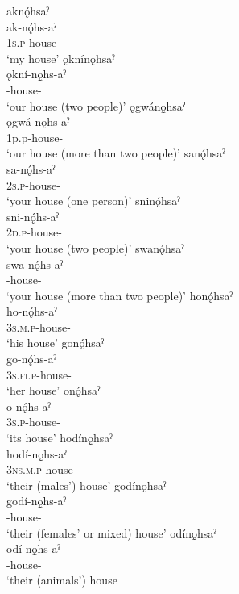 \ea\label{ex:possnounppex}
\ea aknǫ́hsaˀ\\
\gll ak-nǫ́hs-aˀ\\
 \textsc{1s.p}-house-{\nounstemformer}\\
\glt `my house'
\ex ǫknínǫ̱hsaˀ\\
\gll ǫkní-nǫ̱hs-aˀ\\
 -house-{\nounstemformer}\\
\glt `our house (two people)'
\ex ǫgwánǫ̱hsaˀ\\
\gll ǫgwá-nǫ̱hs-aˀ\\
 {1p.p}-house-{\nounstemformer}\\
\glt `our house (more than two people)'
\ex sanǫ́hsaˀ\\
\gll sa-nǫ́hs-aˀ\\
 \textsc{2s.p}-house-{\nounstemformer}\\
\glt `your house (one person)'
\ex sninǫ́hsaˀ\\
\gll sni-nǫ́hs-aˀ\\
 \textsc{2d.p}-house-{\nounstemformer}\\
\glt `your house (two people)'
\ex swanǫ́hsaˀ\\
\gll swa-nǫ́hs-aˀ\\
 -house-{\nounstemformer}\\
\glt `your house (more than two people)'
\ex honǫ́hsaˀ\\
\gll ho-nǫ́hs-aˀ\\
 \textsc{3s.m.p}-house-{\nounstemformer}\\
\glt `his house'
\newpage
\ex gonǫ́hsaˀ\\
\gll go-nǫ́hs-aˀ\\
 \textsc{3s.fi.p}-house-{\nounstemformer}\\
\glt `her house'
\ex onǫ́hsaˀ\\
\gll o-nǫ́hs-aˀ\\
 \textsc{3s.p}-house-{\nounstemformer}\\
\glt `its house'
\ex hodínǫ̱hsaˀ \\
\gll hodí-nǫ̱hs-aˀ \\
\textsc{3ns.m.p}-house-{\nounstemformer}\\
\glt ‘their (males’) house’ 
\ex godínǫ̱hsaˀ \\
\gll godí-nǫ̱hs-aˀ\\
-house-{\nounstemformer}\\
\glt ‘their (females’ or mixed) house’ 
\ex odínǫ̱hsaˀ \\
\gll odí-nǫ̱hs-aˀ \\
-house-{\nounstemformer}\\
\glt ‘their (animals’) house 
\z
\z

